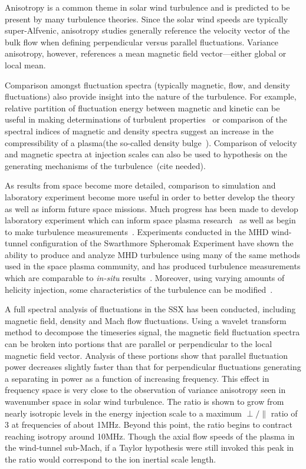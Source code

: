 \documentclass[aip,prl,amsmath,amssymb,reprint,superscriptaddress]{revtex4-1} %
\begin{document}
Anisotropy is a common theme in solar wind turbulence and is predicted to be present by many turbulence theories. Since the solar wind speeds are typically super-Alfvenic, anisotropy studies generally reference the velocity vector of the bulk flow when defining perpendicular versus parallel fluctuations. Variance anisotropy, however, references a mean magnetic field vector---either global or local mean.

Comparison amongst fluctuation spectra (typically magnetic, flow, and density fluctuations) also provide insight into the nature of the turbulence. For example, relative partition of fluctuation energy between magnetic and kinetic can be useful in making determinations of turbulent properties~\cite{podesta07} or comparison of the spectral indices of magnetic and density spectra suggest an increase in the compressibility of a plasma(the so-called density bulge~\cite{harmon05}). Comparison of velocity and magnetic spectra at injection scales can also be used to hypothesis on the generating mechanisms of the turbulence~\cite{}(cite needed).

As results from space become more detailed, comparison to simulation and laboratory experiment become more useful in order to better develop the theory as well as inform future space missions. Much progress has been made to develop laboratory experiment which can inform space plasma research~\cite{howes12a} as well as begin to make turbulence measurements~\cite{ren11}.  Experiments conducted in the MHD wind-tunnel configuration of the Swarthmore Spheromak Experiment have shown the ability to produce and analyze MHD turbulence using many of the same methods used in the space plasma community, and has produced turbulence measurements which are comparable to \textit{in-situ} results~\cite{schaffner14a}. Moreover, using varying amounts of helicity injection, some characteristics of the turbulence can be modified~\cite{schaffner14b}.

A full spectral analysis of fluctuations in the SSX has been conducted, including magnetic field, density and Mach flow fluctuations. Using a wavelet transform method to decompose the timeseries signal, the magnetic field fluctuation spectra can be broken into portions that are parallel or perpendicular to the local magnetic field vector. Analysis of these portions show that parallel fluctuation power decreases slightly faster than that for perpendicular fluctuations generating a separating in power as a function of increasing frequency. This effect in frequency space is very close to the observation of variance anisotropy seen in wavenumber space in solar wind turbulence. The ratio is shown to grow from nearly isotropic levels in the energy injection scale to a maximum $\perp/\parallel$ ratio of 3 at frequencies of about 1MHz. Beyond this point, the ratio begins to contract reaching isotropy around 10MHz. Though the axial flow speeds of the plasma in the wind-tunnel sub-Mach, if a Taylor hypothesis were still invoked this peak in the ratio would correspond to the ion inertial scale length. 
\end{document}
